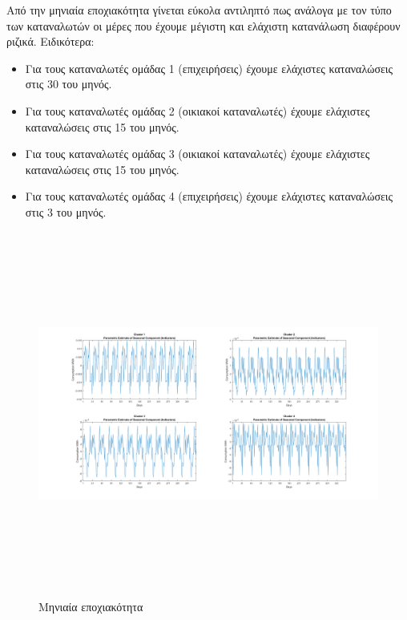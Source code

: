 \documentclass[a4paper, 11pt]{article}
\begin{document}
Από την μηνιαία εποχιακότητα γίνεται εύκολα αντιληπτό πως ανάλογα με τον τύπο των καταναλωτών οι μέρες που έχουμε μέγιστη και ελάχιστη κατανάλωση διαφέρουν ριζικά. Ειδικότερα:
\begin{itemize}
\item Για τους καταναλωτές ομάδας 1 (επιχειρήσεις) έχουμε ελάχιστες καταναλώσεις στις 30 του μηνός.
\item Για τους καταναλωτές ομάδας 2 (οικιακοί καταναλωτές) έχουμε ελάχιστες καταναλώσεις στις 15 του μηνός.
\item Για τους καταναλωτές ομάδας 3 (οικιακοί καταναλωτές) έχουμε ελάχιστες καταναλώσεις στις 15 του μηνός.
\item Για τους καταναλωτές ομάδας 4 (επιχειρήσεις) έχουμε ελάχιστες καταναλώσεις στις 3 του μηνός.
\end{itemize}
\begin{figure}[ht!]
\centering
\includegraphics[width=180mm, height=120mm]{../../plots/Trend_estimation/seasonal_month_ALL.png}
\caption{Μηνιαία εποχιακότητα\label{seasMonth}}
\end{figure}
\end{document}
